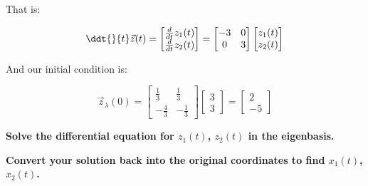 \begin{enumerate}
{That is:

	$$\ddt{}{t} \vec{z}(t) = \begin{bmatrix}\frac{d}{dt} z_{1}(t) \\ \frac{d}{dt}z_{2}(t)\end{bmatrix} = \begin{bmatrix}-3 & 0 \\ 0 & 3\end{bmatrix}\begin{bmatrix}z_{1}(t) \\ z_{2}(t)\end{bmatrix}$$

And our initial condition is:

$$\vec z_{\lambda}(0) = \begin{bmatrix}\frac{1}{3} & \frac{1}{3} \\ -\frac{4}{3} & -\frac{1}{3}\end{bmatrix}\begin{bmatrix} 3 \\ 3 \end{bmatrix} = \begin{bmatrix} 2 \\ -5 \end{bmatrix} $$
}

\qitem \textbf{Solve the differential equation for $z_{1}(t)$, $z_{2}(t)$ in the eigenbasis.}

\ws{
	\vspace{75px}
}


\qitem \textbf{Convert your solution back into the original coordinates to find $x_1(t)$, $x_2(t)$.}




\end{enumerate}
